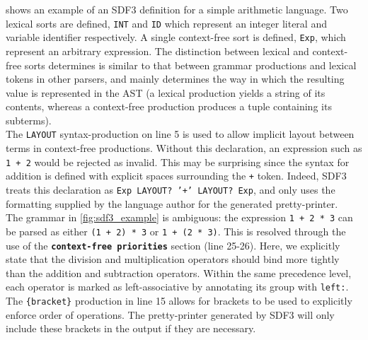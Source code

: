  shows an example of an SDF3 definition for a simple arithmetic language. Two lexical sorts are defined, \texttt{INT} and \texttt{ID} which represent an integer literal and variable identifier respectively. A single context-free sort is defined, \texttt{Exp}, which represent an arbitrary expression. The distinction between lexical and context-free sorts determines is similar to that between grammar productions and lexical tokens in other parsers, and mainly determines the way in which the resulting value is represented in the AST (a lexical production yields a string of its contents, whereas a context-free production produces a tuple containing its subterms).\\

The \texttt{LAYOUT} syntax-production on line 5 is used to allow implicit layout between terms in context-free productions. Without this declaration, an expression such as \texttt{1 + 2} would be rejected as invalid. This may be surprising since the syntax for addition is defined with explicit spaces surrounding the \texttt{+} token. Indeed, SDF3 treats this declaration as \texttt{Exp LAYOUT? '+' LAYOUT? Exp}, and only uses the formatting supplied by the language author for the generated pretty-printer. \\

The grammar in \cref{fig:sdf3_example} is ambiguous: the expression \texttt{1 + 2 * 3} can be parsed as either \texttt{(1 + 2) * 3} or \texttt{1 + (2 * 3)}. This is resolved through the use of the \textbf{\texttt{context-free priorities}} section (line 25-26). Here, we explicitly state that the division and multiplication operators should bind more tightly than the addition and subtraction operators. Within the same precedence level, each operator is marked as left-associative by annotating its group with \texttt{left:}. The \texttt{\{bracket\}} production in line 15 allows for brackets to be used to explicitly enforce order of operations. The pretty-printer generated by SDF3 will only include these brackets in the output if they are necessary.\\

